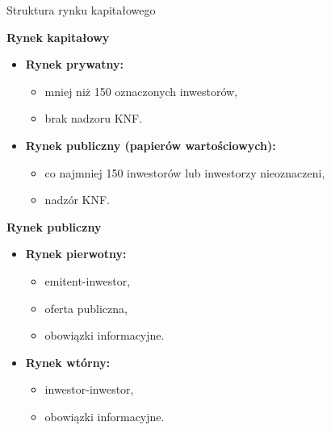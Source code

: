 \documentclass[a4paper, 11pt]{beamer}
\begin{document}
	\begin{frame}{Struktura rynku kapitałowego}
		\begin{block}{\textbf{Rynek kapitałowy}}
			\begin{itemize}
				\item \textbf{Rynek prywatny:}
				\begin{itemize}
					\item mniej niż 150 oznaczonych inwestorów,
					\item brak nadzoru KNF.
				\end{itemize}
				\item \textbf{Rynek publiczny (papierów wartościowych):}
				\begin{itemize}
					\item co najmniej 150 inwestorów lub inwestorzy nieoznaczeni,
					\item nadzór KNF.
				\end{itemize}
			\end{itemize}
		\end{block}
		\begin{block}{\textbf{Rynek publiczny}}
			\begin{itemize}
				\item \textbf{Rynek pierwotny:}
				\begin{itemize}
					\item emitent-inwestor,
					\item oferta publiczna,
					\item obowiązki informacyjne.
				\end{itemize}
				\item \textbf{Rynek wtórny:}
				\begin{itemize}
					\item inwestor-inwestor,
					\item obowiązki informacyjne.
				\end{itemize}
			\end{itemize}
		\end{block}
	\end{frame}
	
\end{document}
